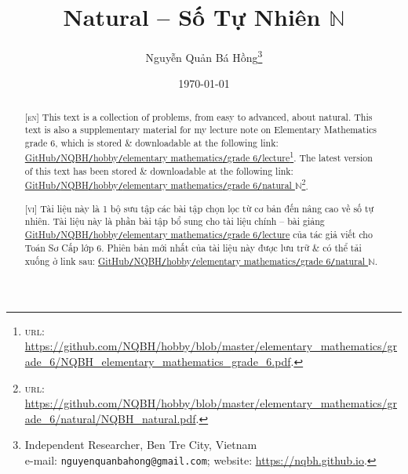 \documentclass{article}
\title{Natural -- Số Tự Nhiên $\mathbb{N}$}
\author{Nguyễn Quản Bá Hồng\footnote{Independent Researcher, Ben Tre City, Vietnam\\e-mail: \texttt{nguyenquanbahong@gmail.com}; website: \url{https://nqbh.github.io}.}}
\date{\today}
\numberwithin{equation}{section}
\begin{document}
\maketitle
\begin{abstract}
	\textsc{[en]} This text is a collection of problems, from easy to advanced, about natural. This text is also a supplementary material for my lecture note on Elementary Mathematics grade 6, which is stored \& downloadable at the following link: \href{https://github.com/NQBH/hobby/blob/master/elementary_mathematics/grade_6/NQBH_elementary_mathematics_grade_6.pdf}{GitHub\texttt{/}NQBH\texttt{/}hobby\texttt{/}elementary mathematics\texttt{/}grade 6\texttt{/}lecture}\footnote{\textsc{url}: \url{https://github.com/NQBH/hobby/blob/master/elementary_mathematics/grade_6/NQBH_elementary_mathematics_grade_6.pdf}.}. The latest version of this text has been stored \& downloadable at the following link: \href{https://github.com/NQBH/hobby/blob/master/elementary_mathematics/grade_6/natural/NQBH_natural.pdf}{GitHub\texttt{/}NQBH\texttt{/}hobby\texttt{/}elementary mathematics\texttt{/}grade 6\texttt{/}natural $\mathbb{N}$}\footnote{\textsc{url}: \url{https://github.com/NQBH/hobby/blob/master/elementary_mathematics/grade_6/natural/NQBH_natural.pdf}.}.
	\vspace{2mm}
	
	\textsc{[vi]} Tài liệu này là 1 bộ sưu tập các bài tập chọn lọc từ cơ bản đến nâng cao về số tự nhiên. Tài liệu này là phần bài tập bổ sung cho tài liệu chính -- bài giảng \href{https://github.com/NQBH/hobby/blob/master/elementary_mathematics/grade_6/NQBH_elementary_mathematics_grade_6.pdf}{GitHub\texttt{/}NQBH\texttt{/}hobby\texttt{/}elementary mathematics\texttt{/}grade 6\texttt{/}lecture} của tác giả viết cho Toán Sơ Cấp lớp 6. Phiên bản mới nhất của tài liệu này được lưu trữ \& có thể tải xuống ở link sau: \href{https://github.com/NQBH/hobby/blob/master/elementary_mathematics/grade_6/natural/NQBH_natural.pdf}{GitHub\texttt{/}NQBH\texttt{/}hobby\texttt{/}elementary mathematics\texttt{/}grade 6\texttt{/}natural $\mathbb{N}$}.
\end{abstract}
\setcounter{secnumdepth}{4}
\setcounter{tocdepth}{3}
\tableofcontents

\end{document}
